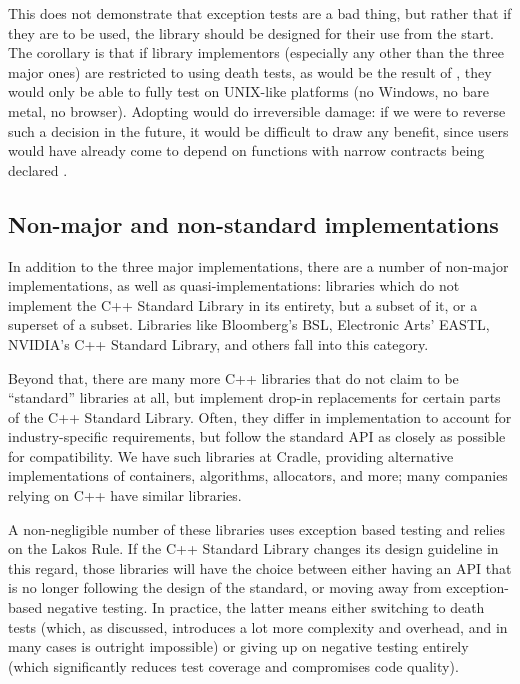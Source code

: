 This does not demonstrate that exception tests are a bad thing, but rather that if they are to be used, the library should be designed for their use from the start. The corollary is that if library implementors (especially any other than the three major ones) are restricted to using death tests, as would be the result of \cite{P1656R2}, they would only be able to fully test on UNIX-like platforms (no Windows, no bare metal, no browser). Adopting \cite{P1656R2} would do irreversible damage: if we were to reverse such a decision in the future, it would be difficult to draw any benefit, since users would have already come to depend on functions with narrow contracts being declared .

\subsection{Non-major and non-standard implementations}

In addition to the three major implementations, there are a number of non-major implementations, as well as quasi-implementations: libraries which do not implement the C++ Standard Library in its entirety, but a subset of it, or a superset of a subset. Libraries like Bloomberg's BSL, Electronic Arts' EASTL, NVIDIA's C++ Standard Library, and others fall into this category.

Beyond that, there are many more C++ libraries that do not claim to be ``standard'' libraries at all, but implement drop-in replacements for certain parts of the C++ Standard Library. Often, they differ in implementation to account for industry-specific requirements, but follow the standard API as closely as possible for compatibility. We have such libraries at Cradle, providing alternative implementations of containers, algorithms, allocators, and more; many companies relying on C++ have similar libraries.

A non-negligible number of these libraries uses exception based testing and relies on the Lakos Rule. If the C++ Standard Library changes its design guideline in this regard, those libraries will have the choice between either having an API that is no longer following the design of the standard, or moving away from exception-based negative testing. In practice, the latter means either switching to death tests (which, as discussed, introduces a lot more complexity and overhead, and in many cases is outright impossible) or giving up on negative testing entirely (which significantly reduces test coverage and compromises code quality).

